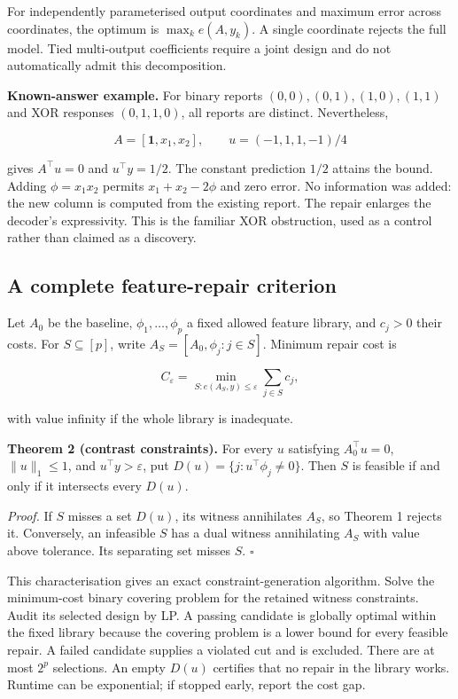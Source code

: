 \documentclass[
  british,
  11pt,
  a4paper,
]{article}
\begin{document}
For independently parameterised output coordinates and maximum error
across coordinates, the optimum is \(\max_k e(A,y_k)\). A single
coordinate rejects the full model. Tied multi-output coefficients
require a joint design and do not automatically admit this
decomposition.

\textbf{Known-answer example.} For binary reports
\((0,0),(0,1),(1,0),(1,1)\) and XOR responses \((0,1,1,0)\), all reports
are distinct. Nevertheless,

\[A=[\mathbf1,x_1,x_2],\qquad u=(-1,1,1,-1)/4\]

gives \(A^\top u=0\) and \(u^\top y=1/2\). The constant prediction
\(1/2\) attains the bound. Adding \(\phi=x_1x_2\) permits
\(x_1+x_2-2\phi\) and zero error. No information was added: the new
column is computed from the existing report. The repair enlarges the
decoder's expressivity. This is the familiar XOR obstruction, used as a
control rather than claimed as a discovery.

\subsection{A complete feature-repair
criterion}\label{a-complete-feature-repair-criterion}

Let \(A_0\) be the baseline, \(\phi_1,\ldots,\phi_p\) a fixed allowed
feature library, and \(c_j>0\) their costs. For \(S\subseteq[p]\), write
\(A_S=[A_0,\phi_j:j\in S]\). Minimum repair cost is

\[ C_\varepsilon=\min_{S:e(A_S,y)\le\varepsilon}\sum_{j\in S}c_j, \]

with value infinity if the whole library is inadequate.

\textbf{Theorem 2 (contrast constraints).} For every \(u\) satisfying
\(A_0^\top u=0\), \(\|u\|_1\le1\), and \(u^\top y>\varepsilon\), put
\(D(u)=\{j:u^\top\phi_j\ne0\}\). Then \(S\) is feasible if and only if
it intersects every \(D(u)\).

\emph{Proof.} If \(S\) misses a set \(D(u)\), its witness annihilates
\(A_S\), so Theorem 1 rejects it. Conversely, an infeasible \(S\) has a
dual witness annihilating \(A_S\) with value above tolerance. Its
separating set misses \(S\). \(\square\)

This characterisation gives an exact constraint-generation algorithm.
Solve the minimum-cost binary covering problem for the retained witness
constraints. Audit its selected design by LP. A passing candidate is
globally optimal within the fixed library because the covering problem
is a lower bound for every feasible repair. A failed candidate supplies
a violated cut and is excluded. There are at most \(2^p\) selections. An
empty \(D(u)\) certifies that no repair in the library works. Runtime
can be exponential; if stopped early, report the cost gap.
\end{document}
